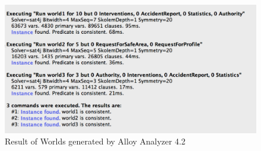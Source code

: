 	\begin{figure}[H]	
		\centering
		\includegraphics[scale=0.35]{images/Result.png}
		\caption{Result of Worlds generated by Alloy Analyzer 4.2}
	\end{figure}